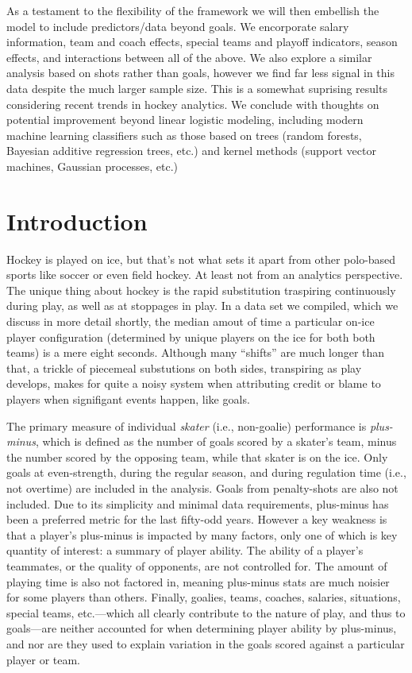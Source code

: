 As a testament to the flexibility of the framework we will then embellish the
model to include predictors/data beyond goals.  We encorporate salary
information, team and coach effects, special teams and playoff indicators,
season effects, and interactions between all of the above.  We also explore a
similar analysis based on shots rather than goals, however we find far less
signal in this data despite the much larger sample size.  This is a somewhat
suprising results considering recent trends in hockey analytics.  We conclude
with thoughts on potential improvement beyond linear logistic modeling,
including modern machine learning classifiers such as those based on trees
(random forests, Bayesian additive regression trees, etc.) and kernel methods
(support vector machines, Gaussian processes, etc.)

\section{Introduction}

Hockey is played on ice, but that's not what sets it apart from other
polo-based sports like soccer or even field hockey.  At least not from an
analytics perspective.  The unique thing about hockey is the rapid
substitution traspiring continuously during play, as well as at stoppages in
play.  In a data set we compiled, which we discuss in more detail shortly, the
median amout of time a particular on-ice player configuration (determined by
unique players on the ice for both both teams) is a mere eight seconds.
Although many ``shifts'' are much longer than that, a trickle of piecemeal
substutions on both sides, transpiring as play develops, makes for quite a
noisy system when attributing credit or blame to players when signifigant
events happen, like goals.

The primary measure of individual {\em skater} (i.e., non-goalie) performance
is {\em plus-minus}, which is defined as the number of goals scored by a
skater's team, minus the number scored by the opposing team, while that skater
is on the ice.  Only goals at even-strength, during the regular season, and
during regulation time (i.e., not overtime) are included in the analysis.
Goals from penalty-shots are also not included.   Due to its simplicity and
minimal data requirements, plus-minus has been a preferred metric for the last
fifty-odd years.  However a key weakness is that a player's plus-minus is
impacted by many factors, only one of which is key quantity of interest: a
summary of player ability.  The ability of a player's teammates, or the
quality of opponents, are not controlled for.  The amount of playing time is
also not factored in, meaning plus-minus stats are much noisier for some
players than others.  Finally, goalies, teams, coaches, salaries, situations,
special teams, etc.---which all clearly contribute to the nature of play, and
thus to goals---are neither accounted for when determining player ability by
plus-minus, and nor are they used to explain variation in the goals scored
against a particular player or team.  

